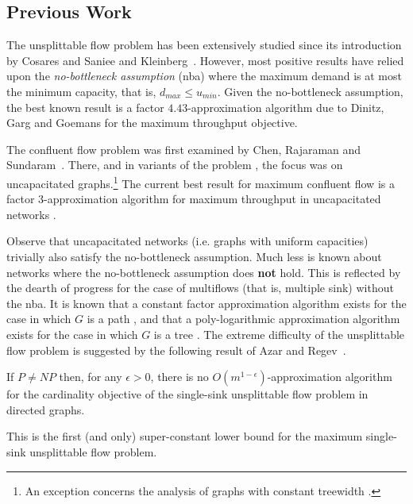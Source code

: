 \documentclass[12pt]{article}
\newcommand{\nba}{{\sc nba}}
\begin{document}
\subsection{Previous Work}\label{sec:previous}
The unsplittable flow problem has been extensively studied since its
introduction by Cosares and Saniee \cite{cosares1994optimization} and Kleinberg~\cite{Kleinberg96}. However, most positive results
have relied upon the {\em no-bottleneck assumption} (\nba)
where the maximum demand is at most the minimum
capacity, that is, $d_{max} \leq u_{min}$.
Given the no-bottleneck assumption, the best known result is a factor $4.43$-approximation
algorithm due to Dinitz, Garg and Goemans \cite{Dinitz99} for the maximum throughput objective.






The confluent flow problem was first examined by Chen, Rajaraman and Sundaram~\cite{Chen05}.
There, and in variants of the problem \cite{Chen07, donovan2007degree, shepherd2009single},  the focus
was on  uncapacitated graphs.\footnote{An exception concerns the analysis of
graphs with constant treewidth \cite{dressler2010capacitated}.}
The current best result for maximum confluent flow is a factor $3$-approximation
algorithm for maximum  throughput in uncapacitated networks \cite{Chen07}.

Observe that uncapacitated networks  (i.e. graphs with uniform capacities) trivially also satisfy
the no-bottleneck assumption. Much less is known about networks where the
no-bottleneck assumption does {\bf not} hold. This
is  reflected by the dearth of progress for the case of multiflows (that is, multiple sink)
without the \nba.
It is known that a constant factor approximation algorithm exists for the case in which
$G$ is a path \cite{bonsma2011constant}, and that a poly-logarithmic approximation algorithm exists for the
case in which $G$ is a tree \cite{chekuri2009unsplittable}.
The extreme difficulty of the unsplittable flow problem is suggested by the following
result of Azar and Regev~\cite{azar2001strongly}.
\begin{thm}\label{thm:ar}
If $P \neq NP$ then, for any $\epsilon > 0$, there is no $O(m^{1-\epsilon})$-approximation algorithm for the cardinality objective
of the single-sink unsplittable flow problem in directed graphs.
\end{thm}
This is the first (and only) super-constant lower bound for the maximum single-sink unsplittable flow problem.
\end{document}
